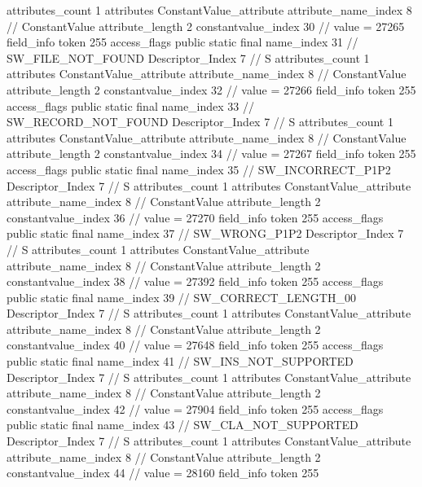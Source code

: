 {{{{{				attributes_count	1
				attributes {
				ConstantValue_attribute {
					attribute_name_index	8		// ConstantValue
					attribute_length	2
					constantvalue_index	30		// value = 27265
				}
				}
			}
			field_info {
				token	255
				access_flags	public static final
				name_index	31		// SW_FILE_NOT_FOUND
				Descriptor_Index	7		// S
				attributes_count	1
				attributes {
				ConstantValue_attribute {
					attribute_name_index	8		// ConstantValue
					attribute_length	2
					constantvalue_index	32		// value = 27266
				}
				}
			}
			field_info {
				token	255
				access_flags	public static final
				name_index	33		// SW_RECORD_NOT_FOUND
				Descriptor_Index	7		// S
				attributes_count	1
				attributes {
				ConstantValue_attribute {
					attribute_name_index	8		// ConstantValue
					attribute_length	2
					constantvalue_index	34		// value = 27267
				}
				}
			}
			field_info {
				token	255
				access_flags	public static final
				name_index	35		// SW_INCORRECT_P1P2
				Descriptor_Index	7		// S
				attributes_count	1
				attributes {
				ConstantValue_attribute {
					attribute_name_index	8		// ConstantValue
					attribute_length	2
					constantvalue_index	36		// value = 27270
				}
				}
			}
			field_info {
				token	255
				access_flags	public static final
				name_index	37		// SW_WRONG_P1P2
				Descriptor_Index	7		// S
				attributes_count	1
				attributes {
				ConstantValue_attribute {
					attribute_name_index	8		// ConstantValue
					attribute_length	2
					constantvalue_index	38		// value = 27392
				}
				}
			}
			field_info {
				token	255
				access_flags	public static final
				name_index	39		// SW_CORRECT_LENGTH_00
				Descriptor_Index	7		// S
				attributes_count	1
				attributes {
				ConstantValue_attribute {
					attribute_name_index	8		// ConstantValue
					attribute_length	2
					constantvalue_index	40		// value = 27648
				}
				}
			}
			field_info {
				token	255
				access_flags	public static final
				name_index	41		// SW_INS_NOT_SUPPORTED
				Descriptor_Index	7		// S
				attributes_count	1
				attributes {
				ConstantValue_attribute {
					attribute_name_index	8		// ConstantValue
					attribute_length	2
					constantvalue_index	42		// value = 27904
				}
				}
			}
			field_info {
				token	255
				access_flags	public static final
				name_index	43		// SW_CLA_NOT_SUPPORTED
				Descriptor_Index	7		// S
				attributes_count	1
				attributes {
				ConstantValue_attribute {
					attribute_name_index	8		// ConstantValue
					attribute_length	2
					constantvalue_index	44		// value = 28160
				}
				}
			}
			field_info {
				token	255
}}}}}
